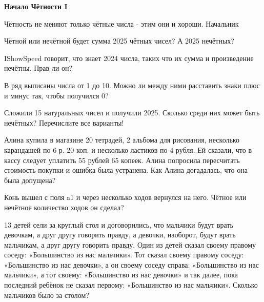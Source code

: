 \centerline{\bf \Huge Начало Чётности I}

\begin{flushright}
        \scriptsize{Чётность не меняют только чётные числа - этим они и хороши. Начальник}
\end{flushright}

 Чётной или нечётной будет сумма 2025 чётных чисел? А 2025 нечётных?

 IShowSpeed говорит, что знает 2024 числа, таких что их сумма и произведение нечётны. Прав ли он?

 В ряд выписаны числа от 1 до 10. Можно ли между ними расставить знаки плюс и минус так, чтобы получился 0?

 Сложили 15 натуральных чисел и получили 2025. Сколько среди них может быть нечётных? Перечислите все варианты!

 Алина купила в магазине 20 тетрадей, 2 альбома для рисования, несколько карандашей по 6 р. 20 коп. и несколько ластиков по 4 рубля. Ей сказали, что в кассу следует уплатить 55 рублей 65 копеек. Алина попросила пересчитать стоимость покупки и ошибка была устранена. Как Алина догадалась, что она была допущена?

 Конь вышел с поля a1 и через несколько ходов вернулся на него. Чётное или нечётное количество ходов он сделал?

 13 детей сели за круглый стол и договорились,
что мальчики будут врать девочкам, а друг другу говорить правду, а девочки, наоборот, будут
врать мальчикам, а друг другу говорить правду. Один из детей сказал своему правому соседу: «Большинство из нас мальчики». Тот сказал своему правому соседу: «Большинство из нас
девочки», а он своему соседу справа: «Большинство из нас мальчики», а тот своему: «Большинство из нас девочки» и так далее, пока последний ребёнок не сказал первому: «Большинство
из нас мальчики». Сколько мальчиков было за столом?